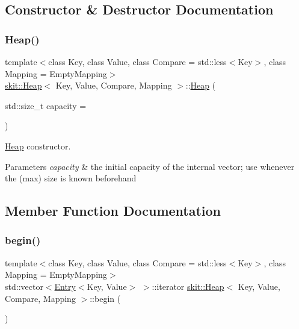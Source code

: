\subsection{Constructor \& Destructor Documentation}
\mbox{\label{classskit_1_1Heap_a4a2cfb1a7cea4ad365b8eaae3c9d6d0d}} 
\subsubsection{\texorpdfstring{Heap()}{Heap()}}
{\footnotesize\ttfamily template$<$class Key, class Value, class Compare = std\+::less$<$\+Key$>$, class Mapping = Empty\+Mapping$>$ \\
\hyperlink{classskit_1_1Heap}{skit\+::\+Heap}$<$ Key, Value, Compare, Mapping $>$\+::\hyperlink{classskit_1_1Heap}{Heap} (\begin{DoxyParamCaption}\item[{std\+::size\+\_\+t}]{capacity = {} }\end{DoxyParamCaption})\hspace{0.3cm}{\ttfamily [inline]}}

\hyperlink{classskit_1_1Heap}{Heap} constructor.


\begin{DoxyParams}{Parameters}
{\em capacity} & the initial capacity of the internal vector; use whenever the (max) size is known beforehand \\
\hline
\end{DoxyParams}


\subsection{Member Function Documentation}
\mbox{\label{classskit_1_1Heap_a53b780fcc5f6e20a8ae04e3e31965ea1}} 
\subsubsection{\texorpdfstring{begin()}{begin()}}
{\footnotesize\ttfamily template$<$class Key, class Value, class Compare = std\+::less$<$\+Key$>$, class Mapping = Empty\+Mapping$>$ \\
std\+::vector$<$\hyperlink{structskit_1_1Entry}{Entry}$<$Key, Value$>$ $>$\+::iterator \hyperlink{classskit_1_1Heap}{skit\+::\+Heap}$<$ Key, Value, Compare, Mapping $>$\+::begin (\begin{DoxyParamCaption}{ }\end{DoxyParamCaption})\hspace{0.3cm}{\ttfamily [inline]}}

